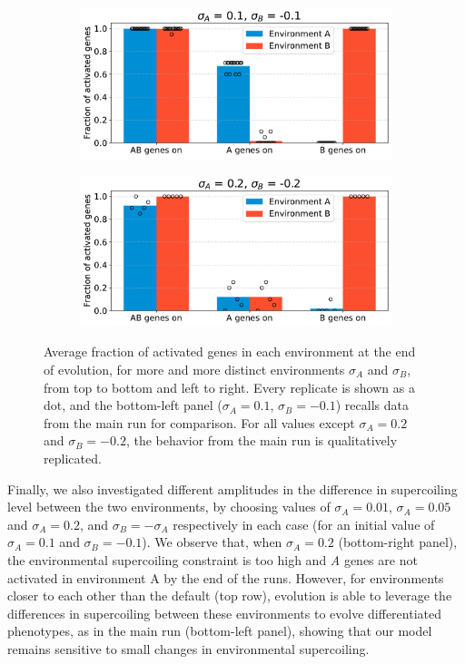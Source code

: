 \begin{figure}[H]
  \begin{subfigure}[t]{0.49\textwidth}
    \includegraphics[width=\textwidth]{alife/img/mean_activation_sigma.pdf}
    \label{subfig:alife:param_sigma_3}
  \end{subfigure}
  \begin{subfigure}[t]{0.49\textwidth}
    \includegraphics[width=\textwidth]{alife/img/mean_activation_sigma-0.2.pdf}
    \label{subfig:alife:param_sigma_4}
  \end{subfigure}
  \caption[Parameter exploration in the simple model: varying $\sigma_A$ and $\sigma_B$]{Average fraction of activated genes in each environment at the end of evolution, for more and more distinct environments $\sigma_A$ and $\sigma_B$, from top to bottom and left to right.
  Every replicate is shown as a dot, and the bottom-left panel ($\sigma_A = 0.1$, $\sigma_B = -0.1$) recalls data from the main run for comparison.
  For all values except $\sigma_A = 0.2$ and $\sigma_B = -0.2$, the behavior from the main run is qualitatively replicated.}
  \label{fig:alife:param_sigma}
\end{figure}

Finally, we also investigated different amplitudes in the difference in supercoiling level between the two environments, by choosing values of $\sigma_A = 0.01$, $\sigma_A = 0.05$ and $\sigma_A = 0.2$, and $\sigma_B = -\sigma_A$ respectively in each case (for an initial value of $\sigma_A = 0.1$ and $\sigma_B = -0.1$).
We observe that, when $\sigma_A = 0.2$ (bottom-right panel), the environmental supercoiling constraint is too high and \emph{A} genes are not activated in environment A by the end of the runs.
However, for environments closer to each other than the default (top row), evolution is able to leverage the differences in supercoiling between these environments to evolve differentiated phenotypes, as in the main run (bottom-left panel), showing that our model remains sensitive to small changes in environmental supercoiling.

